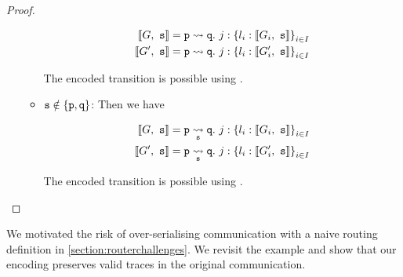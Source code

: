 \begin{proof}
\begin{itemize}
\begin{itemize}
\begin{align*}
\enc{G}{s} &= \gtrans{p}{q}{j}{l_i: \enc{G_i}{s}}{i \in I} \\
\enc{G'}{s} &= \gtrans{p}{q}{j}{l_i: \enc{G'_i}{s}}{i \in I} \\
\end{align*}

The encoded transition is possible using .

\item $\mrole{s} \notin \{ \mrole{p}, \mrole{q} \}$:
Then we have

\begin{align*}
\enc{G}{s} &= \gtransroute{p}{q}{s}{j}{l_i: \enc{G_i}{s}}{i \in I} \\
\enc{G'}{s} &= \gtransroute{p}{q}{s}{j}{l_i: \enc{G'_i}{s}}{i \in I} \\
\end{align*}

The encoded transition is possible using .

\end{itemize}

\end{itemize}

\end{proof}

We motivated the risk of over-serialising communication
with a naive routing definition in \cref{section:routerchallenges}.
We revisit the example and show that our encoding
preserves valid traces in the original communication.

